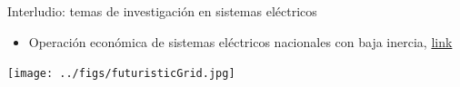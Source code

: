 \documentclass[aspectratio=169, usenames,svgnames,dvipsnames]{beamer}
\begin{document}
\begin{frame}{Interludio: \hspace{3mm}temas de investigación en sistemas eléctricos}

    \vspace{7mm}
    \begin{itemize}
        \item Operación económica de sistemas eléctricos nacionales con baja inercia, \href{https://raw.githubusercontent.com/badber/Miscellany/master/Operacion_sistemas_baja_inercia.pdf}{link}
    \end{itemize}

    \vspace{2mm}
    \begin{center}
        \texttt{[image: ../figs/futuristicGrid.jpg]}
    \end{center}
\end{frame}
\end{document}
